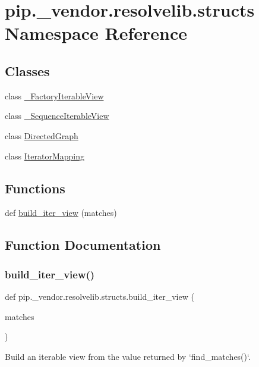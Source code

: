\hypertarget{namespacepip_1_1__vendor_1_1resolvelib_1_1structs}{}\section{pip.\+\_\+vendor.\+resolvelib.\+structs Namespace Reference}
\label{namespacepip_1_1__vendor_1_1resolvelib_1_1structs}
\subsection*{Classes}
\begin{DoxyCompactItemize}
\item 
class \hyperlink{classpip_1_1__vendor_1_1resolvelib_1_1structs_1_1__FactoryIterableView}{\+\_\+\+Factory\+Iterable\+View}
\item 
class \hyperlink{classpip_1_1__vendor_1_1resolvelib_1_1structs_1_1__SequenceIterableView}{\+\_\+\+Sequence\+Iterable\+View}
\item 
class \hyperlink{classpip_1_1__vendor_1_1resolvelib_1_1structs_1_1DirectedGraph}{Directed\+Graph}
\item 
class \hyperlink{classpip_1_1__vendor_1_1resolvelib_1_1structs_1_1IteratorMapping}{Iterator\+Mapping}
\end{DoxyCompactItemize}
\subsection*{Functions}
\begin{DoxyCompactItemize}
\item 
def \hyperlink{namespacepip_1_1__vendor_1_1resolvelib_1_1structs_a68ef57299429b53e3eb82a6732e325e4}{build\+\_\+iter\+\_\+view} (matches)
\end{DoxyCompactItemize}


\subsection{Function Documentation}
\mbox{\label{namespacepip_1_1__vendor_1_1resolvelib_1_1structs_a68ef57299429b53e3eb82a6732e325e4}} 
\subsubsection{\texorpdfstring{build\+\_\+iter\+\_\+view()}{build\_iter\_view()}}
{\footnotesize\ttfamily def pip.\+\_\+vendor.\+resolvelib.\+structs.\+build\+\_\+iter\+\_\+view (\begin{DoxyParamCaption}\item[{}]{matches }\end{DoxyParamCaption})}

\begin{DoxyVerb}Build an iterable view from the value returned by `find_matches()`.\end{DoxyVerb}
 